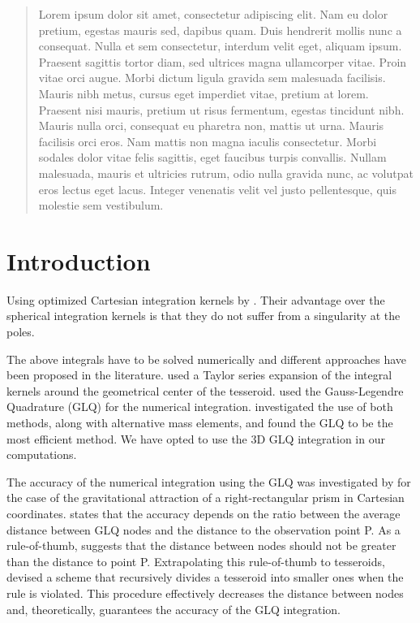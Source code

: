 \begin{abstract}
Lorem ipsum dolor sit amet, consectetur adipiscing elit. Nam eu dolor pretium,
egestas mauris sed, dapibus quam. Duis hendrerit mollis nunc a consequat. Nulla
et sem consectetur, interdum velit eget, aliquam ipsum. Praesent sagittis
tortor diam, sed ultrices magna ullamcorper vitae. Proin vitae orci augue.
Morbi dictum ligula gravida sem malesuada facilisis. Mauris nibh metus, cursus
eget imperdiet vitae, pretium at lorem. Praesent nisi mauris, pretium ut risus
fermentum, egestas tincidunt nibh. Mauris nulla orci, consequat eu pharetra
non, mattis ut urna. Mauris facilisis orci eros. Nam mattis non magna iaculis
consectetur. Morbi sodales dolor vitae felis sagittis, eget faucibus turpis
convallis. Nullam malesuada, mauris et ultricies rutrum, odio nulla gravida
nunc, ac volutpat eros lectus eget lacus. Integer venenatis velit vel justo
pellentesque, quis molestie sem vestibulum.
\end{abstract}

\section{Introduction}

Using optimized Cartesian integration kernels by \citet{Grombein2013}.
Their advantage over the spherical integration kernels
\citep{Wild-Pfeiffer2008} is that they do not suffer from a singularity at the
poles.

The above integrals
have to be solved numerically
\citep{Wild-Pfeiffer2008}
and different approaches have been proposed in the literature.
\citet{Heck2007}
used a Taylor series expansion
of the integral kernels
around the geometrical center of the tesseroid.
\citet{Asgharzadeh2007}
used the Gauss-Legendre Quadrature (GLQ)
for the numerical integration.
\citet{Wild-Pfeiffer2008} investigated
the use of both methods,
along with alternative mass elements,
and found the GLQ to be the most efficient method.
We have opted to use
the 3D GLQ integration in our computations.

The accuracy of the numerical integration
using the GLQ
was investigated by \citet{Ku1977}
for the case of
the gravitational attraction of
a right-rectangular prism
in Cartesian coordinates.
\citet{Ku1977} states that the accuracy
depends on the ratio between
the average distance between GLQ nodes
and the distance to the observation point P.
As a rule-of-thumb,
\citet{Ku1977} suggests that
the distance between nodes
should not be greater than
the distance to point P.
Extrapolating this rule-of-thumb
to tesseroids,
\citet{Li2011}
devised a scheme that
recursively divides a tesseroid
into smaller ones when the rule is violated.
This procedure
effectively decreases the distance between nodes
and, theoretically, guarantees the accuracy of the GLQ integration.

